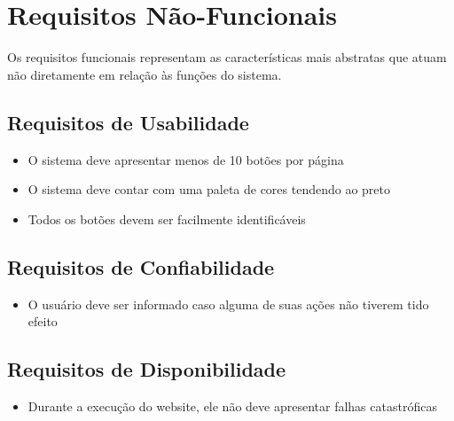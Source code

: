 \section{Requisitos Não-Funcionais} %

    Os requisitos funcionais representam as características mais abstratas que atuam não diretamente em relação às funções do sistema.
    
    \subsection{Requisitos de Usabilidade}
        \begin{itemize}
            \item O sistema deve apresentar menos de 10 botões por página
            \item O sistema deve contar com uma paleta de cores tendendo ao preto
            \item Todos os botões devem ser facilmente identificáveis
        \end{itemize}
    \subsection{Requisitos de Confiabilidade}
        \begin{itemize}
            \item O usuário deve ser informado caso alguma de suas ações não tiverem tido efeito
        \end{itemize}
    \subsection{Requisitos de Disponibilidade}
        \begin{itemize}
            \item Durante a execução do website, ele não deve apresentar falhas catastróficas
        \end{itemize}

